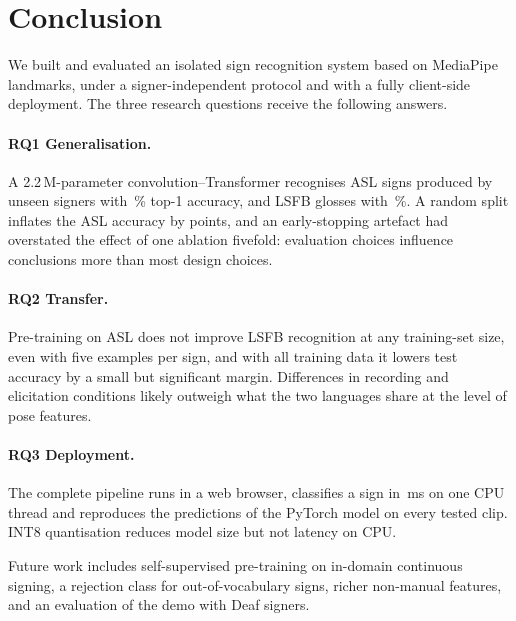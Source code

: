 \section{Conclusion}
\label{sec:conclusion}

We built and evaluated an isolated sign recognition system based on MediaPipe landmarks, under a
signer-independent protocol and with a fully client-side deployment. The three research questions
receive the following answers.

\paragraph{RQ1 Generalisation.} A 2.2\,M-parameter convolution--Transformer recognises
\numAslClasses{} ASL signs produced by unseen signers with \numTrTestTop{}\,\% top-1 accuracy, and
\numLsfbClasses{} LSFB glosses with \numLsfbScratchTest{}\,\%. A random split inflates the ASL
accuracy by \numLeakGap{} points, and an early-stopping artefact had overstated the effect of one
ablation fivefold: evaluation choices influence conclusions more than most design choices.

\paragraph{RQ2 Transfer.} Pre-training on ASL does not improve LSFB recognition at any
training-set size, even with five examples per sign, and with all training data it lowers test
accuracy by a small but significant margin. Differences in recording and elicitation
conditions likely outweigh what the two languages share at the level of pose features.

\paragraph{RQ3 Deployment.} The complete pipeline runs in a web browser, classifies a sign in
\numFpBrowser{}\,ms on one CPU thread and reproduces the predictions of the PyTorch model on every
tested clip. INT8 quantisation reduces model size but not latency on CPU.

Future work includes self-supervised pre-training on in-domain continuous signing, a rejection
class for out-of-vocabulary signs, richer non-manual features, and an evaluation of the demo with
Deaf signers.
